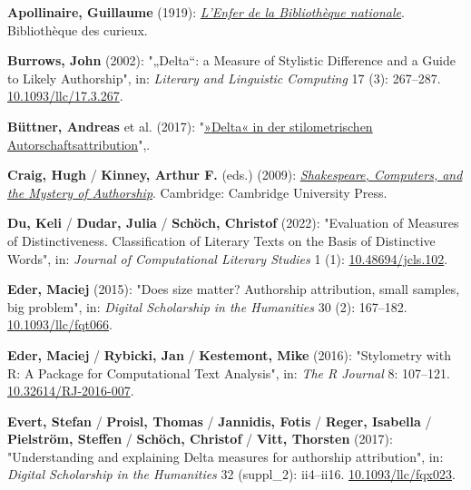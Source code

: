 \documentclass[
  12pt,
  letterpaper,
  DIV=11,
  numbers=noendperiod]{scrreprt}
\newlength{\cslhangindent}
\newenvironment{CSLReferences}[2] %
 {\begin{list}{}{%
  \setlength{\itemindent}{0pt}
  \setlength{\leftmargin}{0pt}
  \setlength{\parsep}{0pt}
  \ifodd #1
   \setlength{\leftmargin}{\cslhangindent}
   \setlength{\itemindent}{-1\cslhangindent}
  \fi
  \setlength{\itemsep}{#2\baselineskip}}}
 {\end{list}}
\begin{document}
\label{refs}
\begin{CSLReferences}{1}{0}
\textbf{Apollinaire, Guillaume} (1919):
\emph{\href{https://fr.wikisource.org/wiki/Livre:Apollinaire_-_L\%E2\%80\%99Enfer_de_la_Biblioth\%C3\%A8que_nationale.djvu}{L'{Enfer}
de la {Bibliothèque} nationale}}. Bibliothèque des curieux.

\textbf{Burrows, John} (2002): "{„{Delta}``}: a {Measure} of {Stylistic}
{Difference} and a {Guide} to {Likely} {Authorship}", in: \emph{Literary
and Linguistic Computing} 17 (3): 267--287.
\href{https://doi.org/10.1093/llc/17.3.267}{10.1093/llc/17.3.267}.

\textbf{Büttner, Andreas} et al. (2017):
"\href{http://dx.doi.org/10.17175/2017_006}{»{Delta}« in der
stilometrischen {Autorschaftsattribution}}",.

\textbf{Craig, Hugh} / \textbf{Kinney, Arthur F.} (eds.) (2009):
\emph{\href{https://doi.org/10.1017/CBO9780511605437}{Shakespeare,
{Computers}, and the {Mystery} of {Authorship}}}. Cambridge: Cambridge
University Press.

\textbf{Du, Keli} / \textbf{Dudar, Julia} / \textbf{Schöch, Christof}
(2022): "Evaluation of {Measures} of {Distinctiveness}. {Classification}
of {Literary} {Texts} on the {Basis} of {Distinctive} {Words}", in:
\emph{Journal of Computational Literary Studies} 1 (1):
\href{https://doi.org/10.48694/jcls.102}{10.48694/jcls.102}.

\textbf{Eder, Maciej} (2015): "Does size matter? {Authorship}
attribution, small samples, big problem", in: \emph{Digital Scholarship
in the Humanities} 30 (2): 167--182.
\href{https://doi.org/10.1093/llc/fqt066}{10.1093/llc/fqt066}.

\textbf{Eder, Maciej} / \textbf{Rybicki, Jan} / \textbf{Kestemont, Mike}
(2016): "Stylometry with {R}: {A} {Package} for {Computational} {Text}
{Analysis}", in: \emph{The R Journal} 8: 107--121.
\href{https://doi.org/10.32614/RJ-2016-007}{10.32614/RJ-2016-007}.

\textbf{Evert, Stefan} / \textbf{Proisl, Thomas} / \textbf{Jannidis,
Fotis} / \textbf{Reger, Isabella} / \textbf{Pielström, Steffen} /
\textbf{Schöch, Christof} / \textbf{Vitt, Thorsten} (2017):
"Understanding and explaining {Delta} measures for authorship
attribution", in: \emph{Digital Scholarship in the Humanities} 32
(suppl\_2): ii4--ii16.
\href{https://doi.org/10.1093/llc/fqx023}{10.1093/llc/fqx023}.


\end{CSLReferences}
\end{document}
